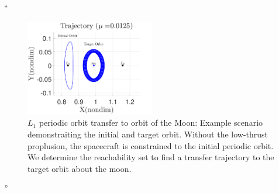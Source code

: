 \documentclass[11pt]{article}
\newenvironment{correction}{\begin{list}{}{\setlength{\leftmargin}{1cm}\setlength{\rightmargin}{1cm}}\vspace{\parsep}\item[]``}{''\end{list}}
\begin{document}
\begin{enumerate}
\begin{correction}
\begin{figure}[H]
   \centering
   \includegraphics[width=0.5\textwidth]{moon_orbit} %
   \caption{\(L_1\) periodic orbit transfer to orbit of the Moon: Example scenario demonstraiting the initial and target orbit.
   Without the low-thrust proplusion, the spacecraft is constrained to the initial periodic orbit. 
   We determine the reachability set to find a transfer trajectory to the target orbit about the moon.}
\end{figure}


\end{correction}
\end{enumerate}
\end{document}
